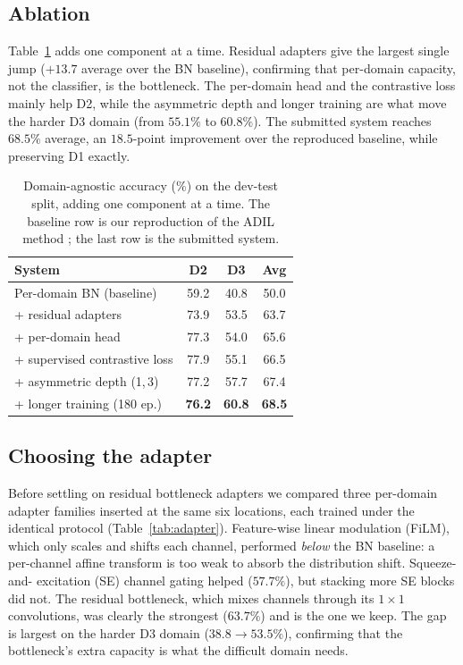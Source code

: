 \documentclass[9pt,conference]{IEEEtran}
\begin{document}
\subsection{Ablation}
\label{ssec:ablation}

Table~\ref{tab:ablation} adds one component at a time. Residual adapters
give the largest single jump ($+13.7$ average over the BN baseline),
confirming that per-domain capacity, not the classifier, is the
bottleneck. The per-domain head and the contrastive loss mainly help D2,
while the asymmetric depth and longer training are what move the harder D3
domain (from $55.1\%$ to $60.8\%$). The submitted system reaches $68.5\%$
average, an $18.5$-point improvement over the reproduced baseline, while
preserving D1 exactly.

\begin{table}[t]
  \centering
  \caption{Domain-agnostic accuracy ($\%$) on the dev-test split, adding
           one component at a time. The baseline row is our reproduction of
           the ADIL method \cite{mulimani2025dil}; the last row is the
           submitted system.}
  \label{tab:ablation}
  \begin{tabularx}{\columnwidth}{Xccc}
    \toprule
    System & D2 & D3 & Avg \\
    \midrule
    Per-domain BN (baseline) \cite{mulimani2025dil} & 59.2 & 40.8 & 50.0 \\
    \;+ residual adapters            & 73.9 & 53.5 & 63.7 \\
    \;+ per-domain head              & 77.3 & 54.0 & 65.6 \\
    \;+ supervised contrastive loss  & 77.9 & 55.1 & 66.5 \\
    \;+ asymmetric depth (1,\,3)     & 77.2 & 57.7 & 67.4 \\
    \;+ longer training (180 ep.)    & \textbf{76.2} & \textbf{60.8} & \textbf{68.5} \\
    \bottomrule
  \end{tabularx}
\end{table}

\subsection{Choosing the adapter}
\label{ssec:adapter_choice}

Before settling on residual bottleneck adapters we compared three
per-domain adapter families inserted at the same six locations, each
trained under the identical protocol (Table~\ref{tab:adapter}).
Feature-wise linear modulation (FiLM), which only scales and shifts each
channel, performed \emph{below} the BN baseline: a per-channel affine
transform is too weak to absorb the distribution shift. Squeeze-and-
excitation (SE) channel gating helped ($57.7\%$), but stacking more SE
blocks did not. The residual bottleneck, which mixes channels through its
$1\times1$ convolutions, was clearly the strongest ($63.7\%$) and is the
one we keep. The gap is largest on the harder D3 domain
($38.8\rightarrow53.5\%$), confirming that the bottleneck's extra capacity
is what the difficult domain needs.
\end{document}
